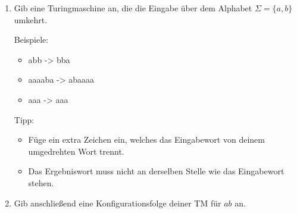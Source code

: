 \documentclass{lehramt-informatik-aufgabe}
\begin{document}
\begin{enumerate}
\item Gib eine Turingmaschine an, die die Eingabe über dem Alphabet
$\Sigma = \{ a, b \}$ umkehrt.

Beispiele:

\begin{itemize}
\item abb -> bba
\item aaaaba -> abaaaa
\item aaa -> aaa
\end{itemize}

Tipp:

\begin{itemize}
\item Füge ein extra Zeichen ein, welches das Eingabewort von deinem
umgedrehten Wort trennt.

\item Das Ergebniswort muss nicht an derselben Stelle wie das
Eingabewort stehen.
\end{itemize}

\item Gib anschließend eine Konfigurationsfolge deiner TM für $ab$ an.

\end{enumerate}
\end{document}

